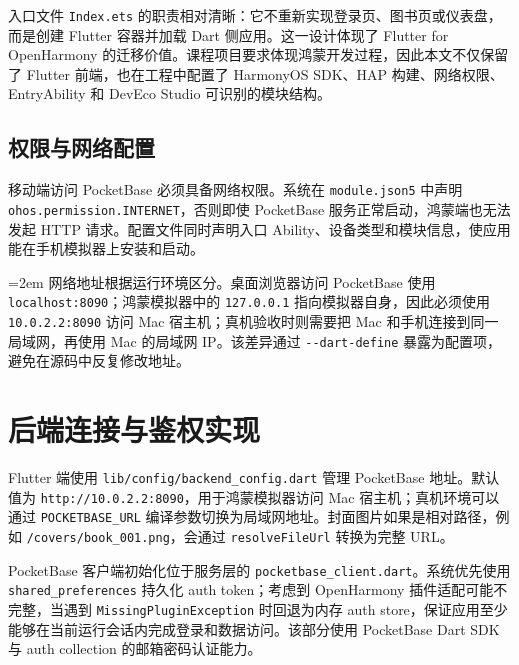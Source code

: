 入口文件 \texttt{Index.ets} 的职责相对清晰：它不重新实现登录页、图书页或仪表盘，而是创建 Flutter 容器并加载 Dart 侧应用。这一设计体现了 Flutter for OpenHarmony 的迁移价值。课程项目要求体现鸿蒙开发过程，因此本文不仅保留了 Flutter 前端，也在工程中配置了 HarmonyOS SDK、HAP 构建、网络权限、EntryAbility 和 DevEco Studio 可识别的模块结构。

\subsection{权限与网络配置}

移动端访问 PocketBase 必须具备网络权限。系统在 \texttt{module.json5} 中声明 \texttt{ohos.permission.INTERNET}，否则即使 PocketBase 服务正常启动，鸿蒙端也无法发起 HTTP 请求。配置文件同时声明入口 Ability、设备类型和模块信息，使应用能在手机模拟器上安装和启动。

{\RaggedRight\emergencystretch=2em 网络地址根据运行环境区分。桌面浏览器访问 PocketBase\hspace{0pt} 使用 \texttt{localhost:8090}；鸿蒙模拟器中的 \texttt{127.0.0.1}\hspace{0pt} 指向模拟器自身，因此必须使用 \texttt{10.0.2.2:8090}\hspace{0pt} 访问 Mac\hspace{0pt} 宿主机；真机验收时则需要把 Mac 和手机连接到同一局域网，再使用 Mac 的局域网 IP。该差异通过 \texttt{-{}-dart-define}\hspace{0pt} 暴露为配置项，避免在源码中反复修改地址。\par}

\section{后端连接与鉴权实现}

Flutter 端使用 \texttt{lib/config/backend\_config.dart} 管理 PocketBase 地址。默认值为 \texttt{http://10.0.2.2:8090}，用于鸿蒙模拟器访问 Mac 宿主机；真机环境可以通过 \texttt{POCKETBASE\_URL} 编译参数切换为局域网地址。封面图片如果是相对路径，例如 \texttt{/covers/book\_001.png}，会通过 \texttt{resolveFileUrl} 转换为完整 URL。

PocketBase 客户端初始化位于服务层的 \texttt{pocketbase\_client.dart}。系统优先使用 \texttt{shared\_preferences} 持久化 auth token；考虑到 OpenHarmony 插件适配可能不完整，当遇到 \texttt{MissingPluginException} 时回退为内存 auth store，保证应用至少能够在当前运行会话内完成登录和数据访问。该部分使用 PocketBase Dart SDK 与 auth collection 的邮箱密码认证能力\cite{pocketbase_dart_sdk,pocketbase_authentication}。

